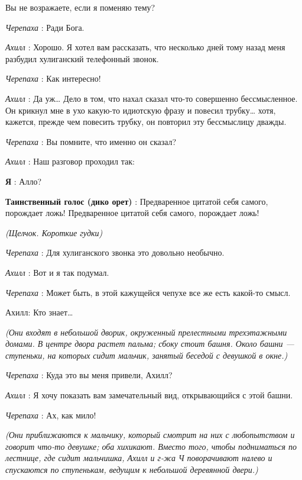 \documentclass[../main.tex]{subfiles}
\begin{document}


\begin{dialogue}

 Вы не возражаете, если я поменяю тему?

\emph{Черепаха} : Ради Бога.

\emph{Ахилл} : Хорошо. Я хотел вам рассказать, что несколько дней тому назад меня разбудил хулиганский телефонный звонок.

\emph{Черепаха} : Как интересно!

\emph{Ахилл} : Да уж\ldots{} Дело в том, что нахал сказал что-то совершенно бессмысленное. Он крикнул мне в ухо какую-то идиотскую фразу и повесил трубку\ldots{} хотя, кажется, прежде чем повесить трубку, он повторил эту бессмыслицу дважды.

\emph{Черепаха} : Вы помните, что именно он сказал?

\emph{Ахилл} : Наш разговор проходил так:

\textbf{Я} : Алло?

\textbf{Таинственный голос (дико орет)} : Предваренное цитатой себя самого, порождает ложь! Предваренное цитатой себя самого, порождает ложь!

\emph{(Щелчок. Короткие гудки)}

\emph{Черепаха} : Для хулиганского звонка это довольно необычно.

\emph{Ахилл} : Вот и я так подумал.

\emph{Черепаха} : Может быть, в этой кажущейся чепухе все же есть какой-то смысл.

Ахилл: Кто знает\ldots{}

\emph{(Они входят в небольшой дворик, окруженный прелестными трехэтажными домами. В центре двора растет пальма; сбоку стоит башня. Около башни --- ступеньки, на которых сидит мальчик, занятый беседой с девушкой в окне.)}

\emph{Черепаха} : Куда это вы меня привели, Ахилл?

\emph{Ахилл} : Я хочу показать вам замечательный вид, открывающийся с этой башни.

\emph{Черепаха} : Ах, как мило!

\emph{(Они приближаются к мальчику, который смотрит на них с любопытством и говорит что-то девушке; оба хихикают. Вместо того, чтобы подниматься по лестнице, где сидит мальчишка, Ахилл и г-жа Ч поворачивают налево и спускаются по ступенькам, ведущим к небольшой деревянной двери.)}


\end{dialogue}
\end{document}
